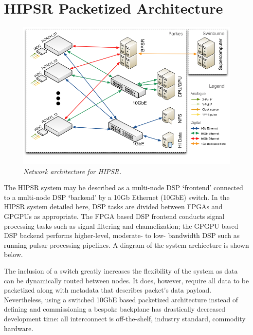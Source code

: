 \documentclass[letterpaper,10pt,english]{sphinxmanual}
\begin{document}
\section{HIPSR Packetized Architecture}
\label{hardware:hipsr-packetized-architecture}\begin{figure}[htbp]
\centering
\capstart

\includegraphics{HIPSR_arch.png}
\caption{\emph{Network architecture for HIPSR.}}\end{figure}

The HIPSR system may be described as a multi-node DSP {\color{red}\bfseries{}{}`}frontend' connected to a multi-node DSP {\color{red}\bfseries{}{}`}backend' by a 10Gb Ethernet (10GbE) switch. In the HIPSR system detailed here, DSP tasks are divided between FPGAs and GPGPUs as appropriate. The FPGA based DSP frontend conducts signal processing tasks such as signal filtering and channelization; the GPGPU based DSP backend performs higher-level, moderate- to low- bandwidth DSP such as running pulsar processing pipelines. A diagram of the system archiecture is shown below.

The inclusion of a switch greatly increases the flexibility of the system as data can be dynamically routed between nodes. It does, however, require all data to be packetized along with metadata that describes packet's data payload. Nevertheless, using a switched 10GbE based packetized architecture instead of defining and commissioning a bespoke backplane has drastically decreased development time: all interconnect is off-the-shelf, industry standard, commodity hardware.
\end{document}
